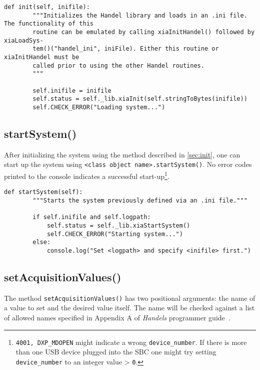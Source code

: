             \begin{lstlisting}[style=mypython, firstnumber=67, caption={[XMagix method init()]XMagix method init().}, label={lst:xmagix init}]
    def init(self, inifile):
        """Initializes the Handel library and loads in an .ini file. The functionality of this
        routine can be emulated by calling xiaInitHandel() followed by xiaLoadSys-
        tem()("handel_ini", iniFile). Either this routine or xiaInitHandel must be
        called prior to using the other Handel routines.
        """

        self.inifile = inifile
        self.status = self._lib.xiaInit(self.stringToBytes(inifile))
        self.CHECK_ERROR("Loading system...")
            \end{lstlisting}
        
        \subsection{startSystem()}\label{sec:startSystem}
            After initializing the system using the method described in \cref{sec:init}, one can start up the system using \texttt{<class object name>.startSystem()}.
            No error codes printed to the console indicates a successful start-up\footnote{\texttt{4001, DXP\_MDOPEN} might indicate a wrong \texttt{device\_number}. If there is more than one USB device plugged into the SBC one might try setting \texttt{device\_number} to an integer value > \texttt{0}.}.\par\medskip

            \begin{lstlisting}[style=mypython, firstnumber=84, caption={[XMagix method startSystem()]XMagix method startSystem().}, label={lst:xmagix startSystem}]
    def startSystem(self):
        """Starts the system previously defined via an .ini file."""

        if self.inifile and self.logpath:
            self.status = self._lib.xiaStartSystem()
            self.CHECK_ERROR("Starting system...")
        else:
            console.log("Set <logpath> and specify <inifile> first.")
            \end{lstlisting}

        \subsection{setAcquisitionValues()}\label{sec:setAcquisitionValues}
            The method \texttt{setAcquisitionValues()} has two positional arguments: the name of a value to set and the desired value itself.
            The name will be checked against a list of allowed names specified in Appendix A of \textit{Handels} programmer guide~\cite{Manual.HandelProgrammersGuideMicroDXP.Xiang}.\par\medskip

